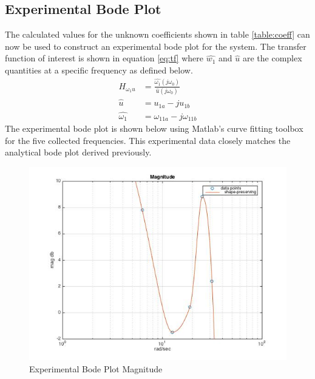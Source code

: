 \documentclass[11pt,titlepage]{article}
\begin{document}
	\subsection{Experimental Bode Plot}
		The calculated values for the unknown coefficients shown in table \ref{table:coeff} can now be used to construct an experimental bode plot for the system. The transfer function of interest is shown in equation \ref{eq:tf} where $\hat{w_1}$ and $\hat{u}$ are the complex quantities at a specific frequency as defined below.
		\begin{align}
			H_{\omega_1u} &= \frac{\hat{\omega_1}(j\omega_0)}{\hat{u}(j\omega_0)} \label{eq:tf} \\[1em]
			\hat{u} &= u_{1a} - ju_{1b} \\[1em]
			\hat{\omega_1} &= \omega_{11a} - j\omega_{11b}
		\end{align}
		The experimental bode plot is shown below using Matlab's curve fitting toolbox for the five collected frequencies. This experimental data closely matches the analytical bode plot derived previously.
		\begin{figure}[H]
			\centering
			\includegraphics[scale=0.6]{experimentalBodeMag}
			\caption{Experimental Bode Plot Magnitude}
		\end{figure}
\end{document}
